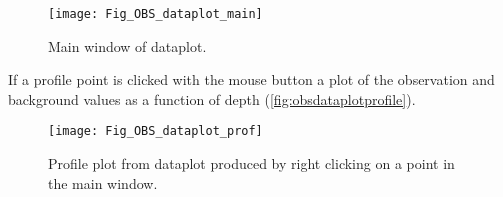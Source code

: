 \documentclass[../tex_main/NEMO_manual]{subfiles}
\begin{document}
\begin{figure}     \begin{center}
\texttt{[image: Fig\_OBS\_dataplot\_main]}
\caption{      \protect\label{fig:obsdataplotmain}
  Main window of dataplot.}
\end{center}     \end{figure}

If a profile point is clicked with the mouse button a plot of the observation and background values as
a function of depth (\autoref{fig:obsdataplotprofile}).

\begin{figure}     \begin{center}
\texttt{[image: Fig\_OBS\_dataplot\_prof]}
\caption{      \protect\label{fig:obsdataplotprofile}
  Profile plot from dataplot produced by right clicking on a point in the main window.}
\end{center}     \end{figure}
\end{document}

